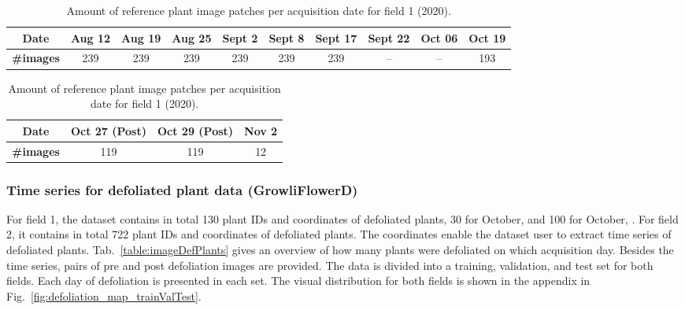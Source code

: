 \documentclass{article}
\def\figref#1{Fig.~\ref{#1}}
\def\tabref#1{Tab.~\ref{#1}}
\begin{document}
\begin{table}[t]
    \begin{minipage}{\textwidth}
        \begin{minipage}{\textwidth}
            \begin{flushleft}
                \begin{tabular}{c|c|c|c|c|c|c|c|c|c }
                    \textbf{Date} & Aug 12 & Aug 19  & Aug 25 & Sept 2 & Sept 8 & Sept 17 & Sept 22 & Oct 06 & Oct 19 \\
                    \hline
                    \textbf{\#images} & 239  & 239 & 239 & 239 & 239 & 239 & -- & -- & 193 \\ 
                    
                \end{tabular}
            \end{flushleft}
        \end{minipage}
        \vspace{8pt}
    
        \begin{minipage}{\textwidth}
            \begin{flushleft}
                \begin{tabular}{c|c|c|c}
                    \textbf{Date} & Oct 27 (Post) & Oct 29 (Post) &  Nov 2 \\
                    \hline
                    \textbf{\#images} & 119 & 119 & 12\\
                \end{tabular}
            \end{flushleft}
        \end{minipage}
    \end{minipage}
    \caption{Amount of reference plant image patches per acquisition date for field 1 (2020).}
    \label{table:imageRefPlants_field1}
\end{table}



\subsubsection{Time series for defoliated plant data (GrowliFlowerD)}\label{sec:GrowliFlowerD}

For field 1, the dataset contains in total 130 plant IDs and coordinates of defoliated plants, 30 for October,  and 100 for October, . For field 2, it contains in total 722 plant IDs and coordinates of defoliated plants. 
The coordinates enable the dataset user to extract time series of defoliated plants. \tabref{table:imageDefPlants} gives an overview of how many plants were defoliated on which acquisition day. Besides the time series, pairs of pre and post defoliation images are provided.
The data is divided into a training, validation, and test set for both fields. Each day of defoliation is presented in each set. The visual distribution for both fields is shown in the appendix in \figref{fig:defoliation_map_trainValTest}. 
\end{document}
